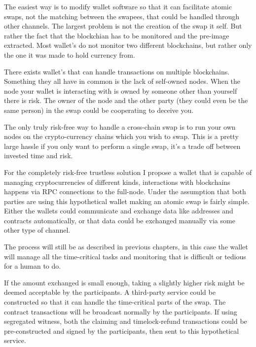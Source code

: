 The easiest way is to modify wallet software so that it can facilitate atomic swaps, not the matching between the swapees, 
that could be handled through other channels. The largest problem is not the creation of the swap it self. But rather
the fact that the blockchian has to be monitored and the pre-image extracted. Most wallet's do not monitor two different blockchains,
but rather only the one it was made to hold currency from. 

There exists wallet's that can handle transactions on multiple blockchains. Something they all have in common is the lack of self-owned
nodes. When the node your wallet is interacting with is owned by someone other than yourself there is risk. The owner of the node and
the other party (they could even be the same person) in the swap could be cooperating to deceive you. 

The only truly risk-free way to handle a cross-chain swap is to run your own nodes on the crypto-currency chains which you wish to swap.
This is a pretty large hassle if you only want to perform a single swap, it's a trade off between invested time and risk. 

For the completely risk-free trustless solution I propose a wallet that is capable of managing cryptocurrencies of different kinds, 
interactions with blockchains happens via RPC connections to the full-node. Under the assumption that both parties are using this
hypothetical wallet making an atomic swap is fairly simple. Either the wallets could communicate and exchange data like addresses 
and contracts automatically, or that data could be exchanged manually via some other type of channel.

The process will still be as described in previous chapters, in this case the wallet will manage all the time-critical tasks and 
monitoring that is difficult or tedious for a human to do.


If the amount exchanged is small enough, taking a slightly higher risk might be deemed acceptable by the participants. A third-party service could be constructed so that it can handle the time-critical parts of the swap. The contract transactions will be broadcast normally by the participants. If using segregated witness, both the claiming and timelock-refund transactions could be pre-constructed and signed by the participants, then sent to this hypothetical service.

